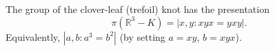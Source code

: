 The group of the clover-leaf (trefoil) knot has the presentation
$$\pi(\mathbb{R}^3 - K) = |x, y : xyx = yxy|.$$
Equivalently, $|a, b : a^3 = b^2|$ (by setting $a = xy$, $b = xyx$).

